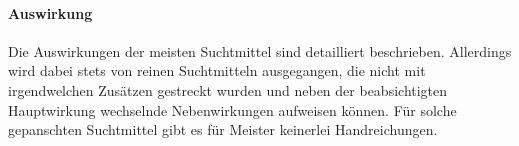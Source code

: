 \paragraph{Auswirkung}
Die Auswirkungen der meisten Suchtmittel sind detailliert beschrieben. Allerdings wird dabei stets von reinen Suchtmitteln ausgegangen, die nicht mit irgendwelchen Zusätzen gestreckt wurden und neben der beabsichtigten Hauptwirkung wechselnde Nebenwirkungen aufweisen können. Für solche gepanschten Suchtmittel gibt es für Meister keinerlei Handreichungen.
